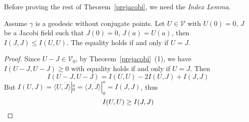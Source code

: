 Before proving the rest of Theorem~\ref{prejacobi}, we need the \emph{Index Lemma}.
\begin{prop}
    Assume $\gamma$ is a geodesic without conjugate points.
    Let $U\in\mathscr{V}$ with $U(0)=0$, $J$ be a Jacobi field such that $J(0)=0$, $J(a)=U(a)$, then $I(J,J)\leq I(U,U)$.
    The equality holds if and only if $U=J$.
\end{prop}
\begin{proof}
    Since $U-J\in\mathscr{V}_0$, by Theorem~\ref{prejacobi}~(1), we have $I(U-J,U-J)\geq 0$ with equality holds if and only if $U=J$. Then
    \[I(U-J,U-J)=I(U,U)-2I(U,J)+I(J,J)\]
    But $I(U,J)=\langle U,\dot{J}\rangle|_0^a=\langle J,\dot{J}\rangle|_0^a=I(J,J)$, thus
    \[I(U,U)\geq I(J,J)\qedhere\]
\end{proof}

